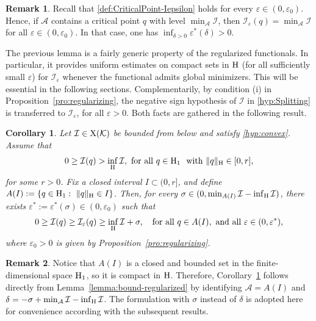 \documentclass{article}
\newcommand{\boK}{\mathcal{K}}
\newcommand{\boI}{\mathcal{I}}
\newcommand{\boA}{\mathcal{A}}
\newcommand{\Hilb}{{\textnormal H}}
\newcommand{\X}{{\textnormal X}}
\newtheorem{corollary}{Corollary}[section]
\theoremstyle{definition}
\newtheorem{remark}{Remark}[section]
\begin{document}
\begin{remark}
Recall that \eqref{def:CriticalPoint-Iepsilon} holds for every $\varepsilon\in(0,\varepsilon_0)$. Hence, if $\boA$ contains a critical point $q$ with level $\min_{\boA}\boI$, then $\boI_\varepsilon(q)=\min_{\boA}\boI$ for all $\varepsilon\in(0,\varepsilon_0)$. In that case, one has  $\inf_{\delta>0}\varepsilon^*(\delta)>0$.
\end{remark}
The previous lemma is a fairly generic property of the  regularized functionals. In particular, it provides uniform estimates on compact sets in $\Hilb$ (for all sufficiently small $\varepsilon$) for $\mathcal{I}_\varepsilon$ whenever the functional admits global minimizers. This will be essential in the following sections. Complementarily, by condition (i) in Proposition~\ref{pro:regularizing}, the negative sign hypothesis of $\boI$ in \eqref{hyp:Splitting} is transferred to $\mathcal{I}_\varepsilon$, for all $\varepsilon>0$. Both facts are gathered in the following result.
\begin{corollary}\label{cor-SplittingRegularized}
Let $\boI\in\X(\boK)$ be bounded from below and satisfy \eqref{hyp:convex}. Assume that
\begin{equation}\label{H:negative_levels}
0\geq\boI(q)>\inf_\Hilb\boI,\ \hbox{for all }q\in\Hilb_1\ \hbox{ with }\|q\|_\Hilb\in[0,r],
\end{equation}
for some $r>0$. Fix a closed interval $I\subset(0,r]$, and define $
   A(I):=\{q\in\Hilb_1:\ \|q\|_\Hilb\in I\}$. Then, for every $\sigma\in(0,\min_{A(I)}\boI-\inf_\Hilb\boI)$, there exists $\varepsilon^*:=\varepsilon^*(\sigma)\in(0,\varepsilon_0)$ such that
\begin{equation}\label{ineq:lemma}
	0\geq\boI(q)\geq\boI_\varepsilon(q)\geq \inf_\Hilb\boI+\sigma,\quad\hbox{for all }q\in A(I),\hbox{ and all }\varepsilon\in(0,\varepsilon^*),
\end{equation}
where $\varepsilon_0>0$ is given by Proposition~\ref{pro:regularizing}. 
\end{corollary}


\begin{remark}
Notice that $A(I)$ is a closed and bounded set in the finite-dimensional space $\Hilb_1$, so it is compact in $\Hilb$. Therefore, Corollary~\ref{cor-SplittingRegularized} follows directly from Lemma~\ref{lemma:bound-regularized} by identifying $\boA=A(I)$ and $\delta=-\sigma+\min_\boA\boI-\inf_\Hilb\boI$. The formulation with $\sigma$ instead of $\delta$ is adopted here for convenience according  with the subsequent results. 
\end{remark}
\end{document}
